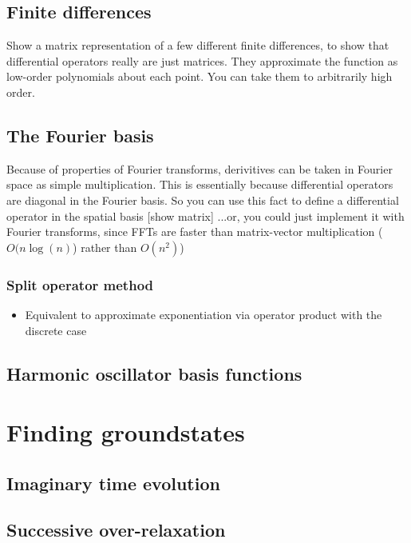     \subsection{Finite differences}
        Show a matrix representation of a few different finite differences, to show that differential operators really are just matrices. They approximate the function as low-order polynomials about each point. You can take them to arbitrarily high order.
    \subsection{The Fourier basis}
        Because of properties of Fourier transforms, derivitives can be taken in Fourier space as simple multiplication. This is essentially because differential operators are diagonal in the Fourier basis. So you can use this fact to define a differential operator in the spatial basis [show matrix] ...or, you could just implement it with Fourier transforms, since FFTs are faster than matrix-vector multiplication ($O(n \log (n)$) rather than $O(n^2)$)
        \subsubsection{Split operator method}
            \begin{itemize}
            \item Equivalent to approximate exponentiation via operator product with the discrete case
            \end{itemize}
    \subsection{Harmonic oscillator basis functions}

\section{Finding groundstates}
\subsection{Imaginary time evolution}
\subsection{Successive over-relaxation}
